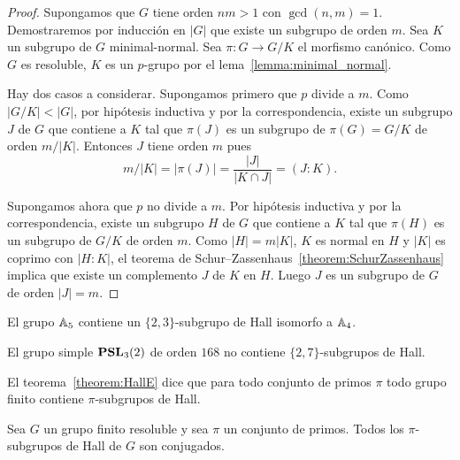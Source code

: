 \begin{proof}
	Supongamos que $G$ tiene orden $nm>1$ con $\gcd(n,m)=1$. Demostraremos por
	inducción en $|G|$ que 	existe un subgrupo de orden $m$. Sea $K$ un
	subgrupo de $G$ minimal-normal. Sea $\pi\colon G\to G/K$ el morfismo
	canónico.  Como $G$ es resoluble, $K$ es un $p$-grupo por el
	lema~\ref{lemma:minimal_normal}.
	
	Hay dos casos a considerar.  Supongamos primero que $p$ divide a $m$. Como
	$|G/K|<|G|$, por hipótesis inductiva y por la correspondencia, existe un
	subgrupo $J$ de $G$ que contiene a $K$ tal que $\pi(J)$ es un subgrupo de
	$\pi(G)=G/K$ de orden $m/|K|$. Entonces $J$ tiene orden $m$ pues 
	\[
	m/|K|=|\pi(J)|=\frac{|J|}{|K\cap J|}=(J:K).
	\]

	Supongamos ahora que $p$ no divide a $m$. Por hipótesis inductiva y por la
	correspondencia, existe un subgrupo $H$ de $G$ que contiene a $K$ tal que
	$\pi(H)$ es un subgrupo de $G/K$ de orden $m$.  Como $|H|=m|K|$, $K$ es
	normal en $H$ y $|K|$ es coprimo con $|H:K|$, el teorema de
	Schur--Zassenhaus~\ref{theorem:SchurZassenhaus} implica que existe un
	complemento $J$ de $K$ en $H$. Luego $J$ es un subgrupo de $G$ de orden
	$|J|=m$.
\end{proof}

\begin{example}
	El grupo $\mathbb{A}_5$ contiene un $\{2,3\}$-subgrupo de Hall isomorfo a
	$\mathbb{A}_4$.
\end{example}

\begin{example}
	El grupo simple $\mathbf{PSL}_3(2)$ de orden $168$ no contiene $\{2,7\}$-subgrupos
	de Hall.
\end{example}

El teorema~\ref{theorem:HallE} dice que para todo conjunto de primos $\pi$
todo grupo finito contiene $\pi$-subgrupos de Hall.

\begin{theorem}[Hall]
	\label{theorem:HallC}
	Sea $G$ un grupo finito resoluble y sea $\pi$ un conjunto de primos. Todos los
	$\pi$-subgrupos de Hall de $G$ son conjugados.
\end{theorem}

